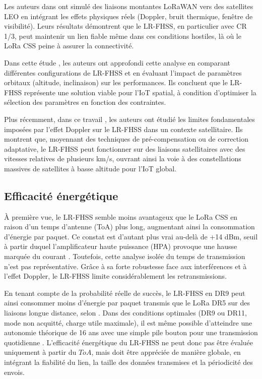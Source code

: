 Les auteurs dans \cite{ieee_lr_fhss_2021} ont simulé des liaisons montantes LoRaWAN vers des satellites LEO en intégrant les effets physiques réels (Doppler, bruit thermique, fenêtre de visibilité). Leurs résultats démontrent que le LR-FHSS, en particulier avec CR 1/3, peut maintenir un lien fiable même dans ces conditions hostiles, là où le LoRa CSS peine à assurer la connectivité.

Dans cette étude \cite{lr_fhss_dts}, les auteurs ont approfondi cette analyse en comparant différentes configurations de LR-FHSS et en évaluant l'impact de paramètres orbitaux (altitude, inclinaison) sur les performances. Ils concluent que le LR-FHSS représente une solution viable pour l'IoT spatial, à condition d'optimiser la sélection des paramètres en fonction des contraintes.

Plus récemment, dans ce travail \cite{doppler_limits}, les auteurs ont étudié les limites fondamentales imposées par l'effet Doppler sur le LR-FHSS dans un contexte satellitaire. Ils montrent que, moyennant des techniques de pré-compensation ou de correction adaptative, le LR-FHSS peut fonctionner sur des liaisons satellitaires avec des vitesses relatives de plusieurs km/s, ouvrant ainsi la voie à des constellations massives de satellites à basse altitude pour l'IoT global.

\subsection{Efficacité énergétique}

À première vue, le LR-FHSS semble moins avantageux que le LoRa CSS en raison d’un temps d’antenne (ToA) plus long, augmentant ainsi la consommation d’énergie par paquet. Ce constat est d'autant plus vrai au-delà de +14 dBm, seuil à partir duquel l’amplificateur haute puissance (HPA) provoque une hausse marquée du courant \cite{ullah2024_energy}. Toutefois, cette analyse isolée du temps de transmission n'est pas représentative. Grâce à sa forte robustesse face aux interférences et à l’effet Doppler, le LR-FHSS limite considérablement les retransmissions. 

En tenant compte de la probabilité réelle de succès, le LR-FHSS en DR9 peut ainsi consommer moins d’énergie par paquet transmis que le LoRa DR5 sur des liaisons longue distance, selon \cite{SanchezVital2024EnergyLRFHSS, ullah2024_energy}. Dans des conditions optimales (DR9 ou DR11, mode non acquitté, charge utile maximale), il est même possible d’atteindre une autonomie théorique de 16 ans avec une simple pile bouton pour une transmission quotidienne \cite{SanchezVital2024EnergyLRFHSS}. L’efficacité énergétique du LR-FHSS ne peut donc pas être évaluée uniquement à partir du $ToA$, mais doit être appréciée de manière globale, en intégrant la fiabilité du lien, la taille des données transmises et la périodicité des envois.

